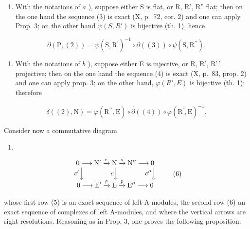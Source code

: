 \begin{enumerate}
\def\labelenumi{\arabic{enumi})}
\setcounter{enumi}{1}
\tightlist
\item
  With the notations of \(a\) ), suppose either S is flat, or R, R', R'' flat; then on the one hand the sequence (3) is exact (X, p.~72, cor. 2) and one can apply Prop. 3; on the other hand \(\psi(S, R')\) is bijective (th. 1), hence
\end{enumerate}

\[
\partial (\mathrm{P}, (2)) = \psi (\mathrm{S}, \mathrm{R} ^ {\prime}) ^ {- 1} \circ \partial ((3)) \circ \psi (\mathrm{S}, \mathrm{R} ^ {\prime \prime}).
\]

\begin{enumerate}
\def\labelenumi{\arabic{enumi})}
\setcounter{enumi}{2}
\tightlist
\item
  With the notations of \(b\) ), suppose either E is injective, or R, R', R'\,' projective; then on the one hand the sequence (4) is exact (X, p.~83, prop. 2) and one can apply prop. 3; on the other hand, \(\varphi(R', E)\) is bijective (th. 1); therefore
\end{enumerate}

\[
\delta ((2), \mathrm{N}) = \varphi (\mathrm{R} ^ {\prime \prime}, \mathrm{E}) \circ \hat {\partial} ((4)) \circ \varphi (\mathrm{R} ^ {\prime}, \mathrm{E}) ^ {- 1}.
\]

Consider now a commutative diagram

\begin{enumerate}
\def\labelenumi{(\arabic{enumi})}
\setcounter{enumi}{4}
\tightlist
\item
\end{enumerate}

\[
\begin{array}{c} 0 \longrightarrow \mathrm{N} ^ {\prime} \xrightarrow {r} \mathrm{N} \xrightarrow {s} \mathrm{N} ^ {\prime \prime} \longrightarrow 0 \\ c ^ {\prime} \Big \downarrow \qquad \qquad c \Big \downarrow \qquad \qquad c ^ {\prime \prime} \Big \downarrow \\ 0 \longrightarrow \mathrm{E} ^ {\prime} \xrightarrow {\tilde {r}} \mathrm{E} \xrightarrow {\tilde {s}} \mathrm{E} ^ {\prime \prime} \longrightarrow 0 \end{array}\tag{6}
\]

whose first row (5) is an exact sequence of left A-modules, the second row (6) an exact sequence of complexes of left A-modules, and where the vertical arrows are right resolutions. Reasoning as in Prop. 3, one proves the following proposition:

